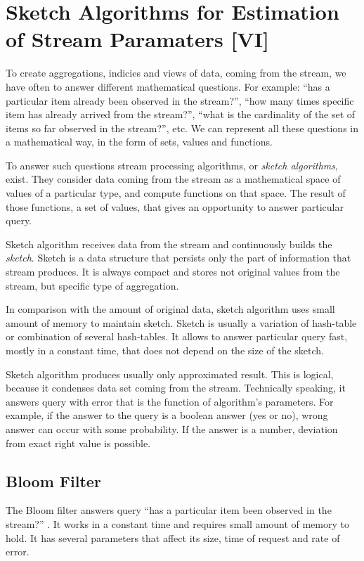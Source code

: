 \section{Sketch Algorithms for Estimation of Stream Paramaters [VI]}

To create aggregations, indicies and views of data, coming from the stream, we have often to answer different mathematical questions.
For example: ``has a particular item already been observed in the stream?'', ``how many times specific item has already arrived from the stream?'', ``what is the cardinality of the set of items so far observed in the stream?'', etc.
We can represent all these questions in a mathematical way, in the form of sets, values and functions.

To answer such questions stream processing algorithms, or \textit{sketch algorithms}, exist.
They consider data coming from the stream as a mathematical space of values of a particular type, and compute functions on that space.
The result of those functions, a set of values, that gives an opportunity to answer particular query.

Sketch algorithm receives data from the stream and continuously builds the \textit{sketch}.
Sketch is a data structure that persists only the part of information that stream produces.
It is always compact and stores not original values from the stream, but specific type of aggregation.

In comparison with the amount of original data, sketch algorithm uses small amount of memory to maintain sketch.
Sketch is usually a variation of hash-table or combination of several hash-tables.
It allows to answer particular query fast, mostly in a constant time, that does not depend on the size of the sketch.

Sketch algorithm produces usually only approximated result.
This is logical, because it condenses data set coming from the stream.
Technically speaking, it answers query with error that is the function of algorithm's parameters.
For example, if the answer to the query is a boolean answer (yes or no), wrong answer can occur with some probability.
If the answer is a number, deviation from exact right value is possible.

\subsection{Bloom Filter}

The Bloom filter answers query ``has a particular item been observed in the stream?'' \cite{Cormode}.
It works in a constant time and requires small amount of memory to hold.
It has several parameters that affect its size, time of request and rate of error.

